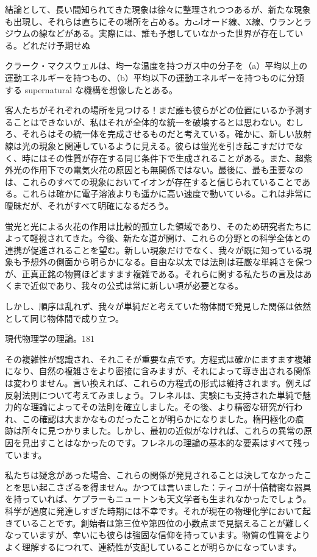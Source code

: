 \documentclass[a4paper,11pt,openany]{ltjsbook}
\begin{document}
結論として、長い間知られてきた現象は徐々に整理されつつあるが、新たな現象も出現し、それらは直ちにその場所を占める。カاثオード線、X線、ウランとラジウムの線などがある。実際には、誰も予想していなかった世界が存在している。どれだけ予期せぬ

 クラーク・マクスウェルは、均一な温度を持つガス中の分子を（a）平均以上の運動エネルギーを持つもの、（b）平均以下の運動エネルギーを持つものに分類する supernatural な機構を想像したとある。


客人たちがそれぞれの場所を見つける！まだ誰も彼らがどの位置にいるか予測することはできないが、私はそれが全体的な統一を破壊するとは思わない。むしろ、それらはその統一体を完成させるものだと考えている。確かに、新しい放射線は光の現象と関連しているように見える。彼らは蛍光を引き起こすだけでなく、時にはその性質が存在する同じ条件下で生成されることがある。また、超紫外光の作用下での電気火花の原因とも無関係ではない。最後に、最も重要なのは、これらのすべての現象においてイオンが存在すると信じられていることである。これらは確かに電子溶液よりも遥かに高い速度で動いている。これは非常に曖昧だが、それがすべて明確になるだろう。

蛍光と光による火花の作用は比較的孤立した領域であり、そのため研究者たちによって軽視されてきた。今後、新たな道が開け、これらの分野との科学全体との連携が促進されることを望む。新しい現象だけでなく、我々が既に知っている現象も予想外の側面から明らかになる。自由な以太では法則は荘厳な単純さを保つが、正真正銘の物質ほどますます複雑である。それらに関する私たちの言及はあくまで近似であり、我々の公式は常に新しい項が必要となる。

しかし、順序は乱れず、我々が単純だと考えていた物体間で発見した関係は依然として同じ物体間で成り立つ。

現代物理学の理論。181

その複雑性が認識され、それこそが重要な点です。方程式は確かにますます複雑になり、自然の複雑さをより密接に含みますが、それによって導き出される関係は変わりません。言い換えれば、これらの方程式の形式は維持されます。例えば反射法則について考えてみましょう。フレネルは、実験にも支持された単純で魅力的な理論によってその法則を確立しました。その後、より精密な研究が行われ、この確認は大まかなものだったことが明らかになりました。楕円極化の痕跡は所々に見つかりました。しかし、最初の近似がなければ、これらの異常の原因を見出すことはなかったのです。フレネルの理論の基本的な要素はすべて残っています。

私たちは疑念があった場合、これらの関係が発見されることは決してなかったことを思い起こさざるを得ません。かつては言いました：ティコが十倍精密な器具を持っていれば、ケプラーもニュートンも天文学者も生まれなかったでしょう。科学が過度に発達しすぎた時期には不幸です。それが現在の物理化学において起きていることです。創始者は第三位や第四位の小数点まで見据えることが難しくなっていますが、幸いにも彼らは強固な信仰を持っています。物質の性質をよりよく理解するにつれて、連続性が支配していることが明らかになっています。
\end{document}
